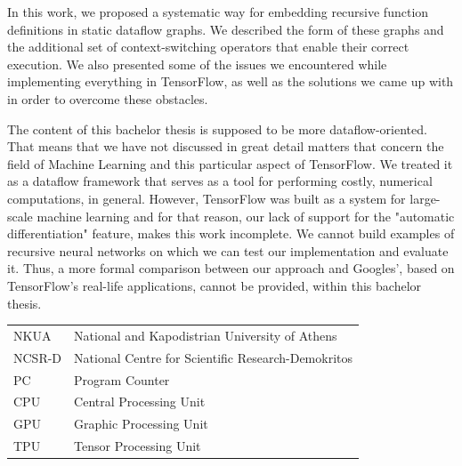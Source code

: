 \documentclass[ack,preface]{dithesis}
\begin{document}
In this work,  we proposed a systematic way for embedding recursive function definitions in static dataflow graphs. We described the form of these graphs and the additional set of context-switching operators that enable their correct execution. We also presented some of the issues we encountered while implementing everything in TensorFlow, as well as the solutions we came up with in order to overcome these obstacles.

The content of this bachelor thesis is supposed to be more dataflow-oriented. That means that we have not discussed in great detail matters that concern the field of  Machine Learning and this particular aspect of TensorFlow. We treated it as a dataflow framework that serves as a tool for performing  costly, numerical computations, in general. However, TensorFlow was  built as a system for large-scale machine learning and for that reason, our lack of support for the "automatic differentiation" feature, makes this work incomplete. We cannot build examples of recursive neural networks on which we can test our implementation and evaluate it.  Thus, a more formal comparison between our approach and Googles', based on TensorFlow's real-life applications, cannot be provided, within this bachelor thesis.


\backmatter

\abbreviations
\begin{center}
	\renewcommand{\arraystretch}{1.5}
	\begin{longtable}{ l @{\qquad} l }
	\toprule
	NKUA    & National and Kapodistrian University of Athens\\
	NCSR-D & National Centre for Scientific Research-Demokritos \\
	PC & Program Counter \\
	CPU & Central Processing Unit\\
	GPU & Graphic Processing Unit\\
	TPU & Tensor Processing Unit\\
	\bottomrule
	\end{longtable}
\end{center}
\end{document}
